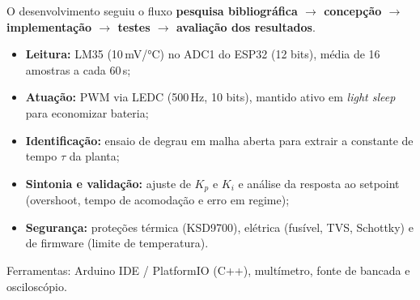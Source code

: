 
O desenvolvimento seguiu o fluxo \textbf{pesquisa bibliográfica \(\to\) concepção \(\to\)
implementação \(\to\) testes \(\to\) avaliação dos resultados}.

\begin{itemize}
  \item \textbf{Leitura:} LM35 (10\,mV/°C) no ADC1 do ESP32 (12 bits), média de 16 amostras
        a cada 60\,s;
  \item \textbf{Atuação:} PWM via LEDC (500\,Hz, 10 bits), mantido ativo em \emph{light sleep}
        para economizar bateria;
  \item \textbf{Identificação:} ensaio de degrau em malha aberta para extrair a constante de
        tempo \(\tau\) da planta;
  \item \textbf{Sintonia e validação:} ajuste de \(K_p\) e \(K_i\) e análise da resposta ao
        setpoint (overshoot, tempo de acomodação e erro em regime);
  \item \textbf{Segurança:} proteções térmica (KSD9700), elétrica (fusível, TVS, Schottky) e de
        firmware (limite de temperatura).
\end{itemize}

Ferramentas: Arduino IDE / PlatformIO (C++), multímetro, fonte de bancada e osciloscópio.
